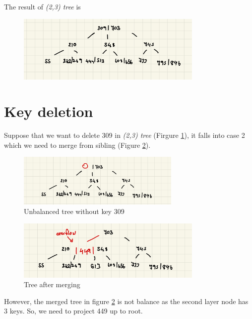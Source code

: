 \documentclass[a4paper, 12pt]{report}
\begin{document}
The result of \emph{(2,3) tree} is

\begin{figure}[h]
        \centering
        \includegraphics[width=0.8\textwidth,scale=0.5]{tree_insertion.jpeg}
\end{figure}

\section{Key deletion}

\noindent Suppose that we want to delete 309 in \emph{(2,3) tree} (Firgure \ref{fig:tree-deletion-1}), it falls into case 2 which 
we need to merge from sibling (Figure \ref{fig:tree-deletion-2}).

\begin{figure}[h]
        \centering
        \includegraphics[width=0.7\textwidth,scale=0.5]{tree_deletion_1.jpeg}
        \caption{\label{fig:tree-deletion-1} Unbalanced tree without key 309}
\end{figure}

\begin{figure}[h]
        \centering
        \includegraphics[width=0.8\textwidth,scale=0.5]{tree_deletion_2.jpeg}
        \caption{\label{fig:tree-deletion-2} Tree after merging}
\end{figure}

However, the merged tree in figure \ref{fig:tree-deletion-2} is not balance as the second layer node has 3 keys. So, we need to project 449 up to root.
\end{document}
